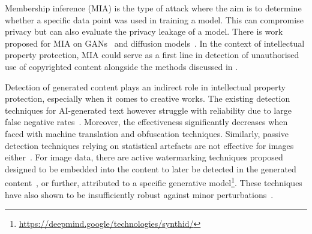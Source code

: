 \documentclass[conference]{IEEEtran}
\begin{document}
Membership inference (MIA) is the type of attack where the aim is to determine whether a specific data point was used in training a model. 
This can compromise privacy but can also evaluate the privacy leakage of a model. 
There is work proposed for MIA on GANs~\cite{webster_this_2021,hayes_logan_2018} and diffusion models~\cite{matsumoto_membership_2023,hu_membership_2023}. 
In the context of intellectual property protection, MIA could serve as a first line in detection of unauthorised use of copyrighted content alongside the methods discussed in . 

Detection of generated content plays an indirect role in intellectual property protection, especially when it comes to creative works. 
The existing detection techniques for AI-generated text however struggle with reliability due to large false negative rates~\cite{sadasivan_can_2024,weber-wulff_testing_2023}. Moreover, the effectiveness significantly decreases when faced with machine translation and obfuscation techniques.
Similarly, passive detection techniques relying on statistical artefacts are not effective for images either~\cite{corvi_detection_2023}.
For image data, there are active watermarking techniques proposed designed to be embedded into the content to later be detected in the generated content~\cite{zhu_hidden_2018,zhang_udh_2020}, or further, attributed to a specific generative model\footnote{\url{https://deepmind.google/technologies/synthid/}}.%
These techniques have also shown to be insufficiently robust against minor perturbations~\cite{jiang_evading_2023}. 
\end{document}
